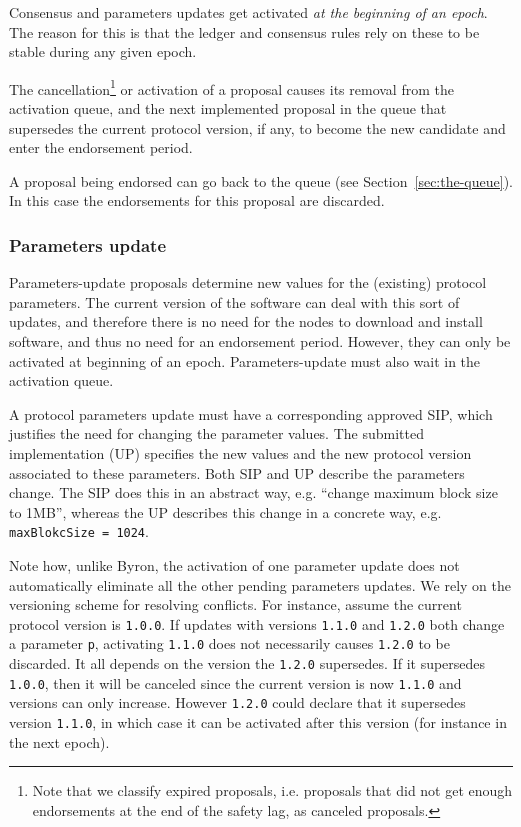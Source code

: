 Consensus and parameters updates get activated \emph{at the beginning of an
	epoch}. The reason for this is that the ledger and consensus rules rely on
these to be stable during any given epoch.

The cancellation\footnote{Note that we classify expired proposals, i.e.
  proposals that did not get enough endorsements at the end of the safety lag,
  as canceled proposals.} or activation of a proposal causes its removal from
the activation queue, and the next implemented proposal in the queue that
supersedes the current protocol version, if any, to become the new candidate and
enter the endorsement period.

A proposal being endorsed can go back to the queue (see
Section~\ref{sec:the-queue}). In this case the endorsements for this proposal
are discarded.

\subsubsection{Parameters update}
\label{sec:parameters-update}

Parameters-update proposals determine new values for the (existing) protocol
parameters. The current version of the software can deal with this sort of
updates, and therefore there is no need for the nodes to download and install
software, and thus no need for an endorsement period. However, they can only be
activated at beginning of an epoch. Parameters-update must also wait in the
activation queue.

A protocol parameters update must have a corresponding approved SIP, which
justifies the need for changing the parameter values. The submitted
implementation (UP) specifies the new values and the new protocol version
associated to these parameters. Both SIP and UP describe the parameters change.
The SIP does this in an abstract way, e.g. ``change maximum block size to 1MB'',
whereas the UP describes this change in a concrete way, e.g.
\texttt{maxBlokcSize = 1024}.

Note how, unlike Byron, the activation of one parameter update does not
automatically eliminate all the other pending parameters updates. We rely on the
versioning scheme for resolving conflicts. For instance, assume the current
protocol version is \texttt{1.0.0}. If updates with versions \texttt{1.1.0} and
\texttt{1.2.0} both change a parameter \texttt{p}, activating \texttt{1.1.0}
does not necessarily causes \texttt{1.2.0} to be discarded. It all depends on
the version the \texttt{1.2.0} supersedes. If it supersedes \texttt{1.0.0}, then
it will be canceled since the current version is now \texttt{1.1.0} and versions
can only increase. However \texttt{1.2.0} could declare that it supersedes
version \texttt{1.1.0}, in which case it can be activated after this version
(for instance in the next epoch).


